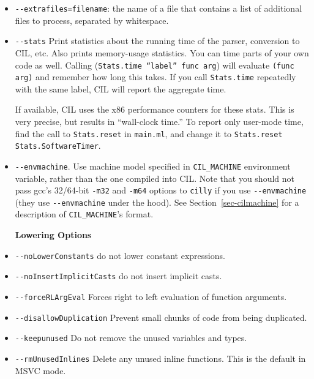 \documentclass[letterpaper]{article}
\def\secref#1{Section~\ref{sec-#1}}
\def\t#1{{\tt #1}}
\begin{document}
\begin{itemize}
  \item \t{-{}-extrafiles=filename}: the name of a file that contains
    a list of additional files to process, separated by whitespace.
  \item \t{-{}-stats} Print statistics about the running time of the
    parser, conversion to CIL, etc.  Also prints memory-usage
    statistics.  You can time parts of your own code as well.  Calling
    (\t{Stats.time ``label'' func arg}) will evaluate \t{(func arg)}
    and remember how long this takes.  If you call \t{Stats.time}
    repeatedly with the same label, CIL will report the aggregate
    time.

    If available, CIL uses the x86 performance counters for these
    stats.  This is very precise, but results in ``wall-clock time.''
    To report only user-mode time, find the call to \t{Stats.reset} in
    \t{main.ml}, and change it to \t{Stats.reset Stats.SoftwareTimer}.
  
  \item \t{-{}-envmachine}. Use machine model specified in
    \t{CIL\_MACHINE} environment variable, rather than the one
    compiled into CIL. Note that you should not pass gcc's 32/64-bit
    \t{-m32} and \t{-m64} options to \t{cilly} if you use
    \t{-{}-envmachine} (they use \t{-{}-envmachine} under the hood).
    See \secref{cilmachine} for a description of \t{CIL\_MACHINE}'s
    format.

   {\bf Lowering Options}
  \item \t{-{}-noLowerConstants} do not lower constant expressions.
  \item \t{-{}-noInsertImplicitCasts} do not insert implicit casts.
  \item \t{-{}-forceRLArgEval} Forces right to left evaluation of function arguments.
  \item \t{-{}-disallowDuplication} Prevent small chunks of code from being duplicated.
  \item \t{-{}-keepunused} Do not remove the unused variables and types.
  \item \t{-{}-rmUnusedInlines} Delete any unused inline functions.  This is the default in MSVC mode.
   

\end{itemize}
\end{document}
